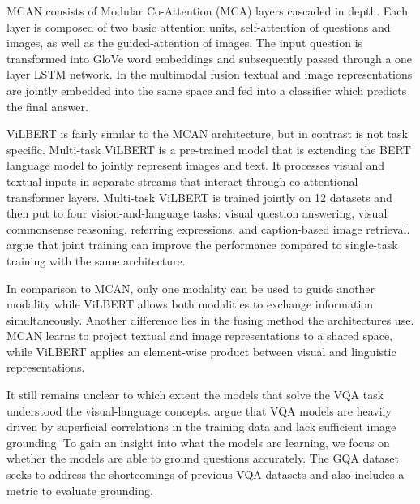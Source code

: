 \documentclass{article}
\begin{document}
MCAN consists of Modular Co-Attention (MCA) layers cascaded in depth. Each layer is composed of two basic attention units, self-attention of questions and images, as well as the guided-attention of images. The input question is transformed into GloVe word embeddings and subsequently passed through a one layer LSTM network. In the multimodal fusion textual and image representations are jointly embedded into the same space and fed into a classifier which predicts the final answer.

ViLBERT is fairly similar to the MCAN architecture, but in contrast is not task specific. Multi-task ViLBERT is a pre-trained model that is extending the BERT language model \citep{devlin-etal-2019-bert} to jointly represent images and text. It processes visual and textual inputs in separate streams that interact through co-attentional transformer layers. Multi-task ViLBERT is trained jointly on 12 datasets and then put to four vision-and-language tasks: visual question answering, visual commonsense reasoning, referring expressions, and caption-based image retrieval. \cite{lu2020multitask} argue that joint training can improve the performance compared to single-task training with the same architecture. 

In comparison to MCAN, only one modality can be used to guide another modality while ViLBERT allows both modalities to exchange information simultaneously. Another difference lies in the fusing method the architectures use. MCAN learns to project textual and image representations to a shared space, while ViLBERT applies an element-wise product between visual and linguistic representations.

It still remains unclear to which extent the models that solve the VQA task understood the visual-language concepts. \cite{agrawal12018gvqa} argue that VQA models are heavily driven by superficial correlations in the training data and lack sufficient image grounding. To gain an insight into what the models are learning, we focus on whether the models are able to ground questions accurately. The GQA dataset \citep{hudson2019gqa} seeks to address the shortcomings of previous VQA datasets and also includes a metric to evaluate grounding.
\end{document}
